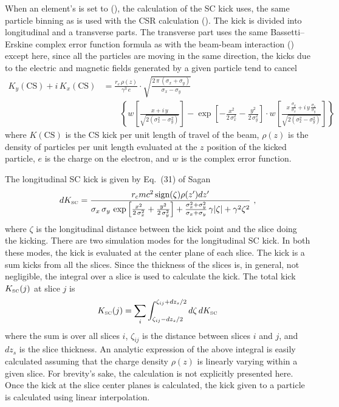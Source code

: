 When an element's  is set to  (), the
calculation of the SC kick uses, the same particle binning as is used with the  CSR
calculation (). The kick is divided into longitudinal and a transverse parts. The
transverse part uses the same Bassetti--Erskine complex error function formula\cite{b:talman} as
with the beam-beam interaction () except here, since all the particles are
moving in the same direction, the kicks due to the electric and magnetic fields generated by a given
particle tend to cancel
\begin{align}
  K_y(\text{CS}) + i \, K_x(\text{CS}) &=
  \frac{r_e \, \rho(z)}{\gamma^3 \, e} \cdot
  \sqrt{\frac{2 \, \pi \, (\sigma_x + \sigma_y)}{\sigma_x - \sigma_y}} \label{fsp1r} \\
  & \qquad \left\{ w \left[ \frac{x + i \, y}{\sqrt{2 (\sigma_x^2 - \sigma_y^2)}} \right] -
  \exp \left[ -\frac{x^2}{2 \, \sigma_x^2} - \frac{y^2}{2 \, \sigma_y^2} \right] \cdot
  w \left[ \frac{x \, \frac{\sigma_y}{\sigma_x} + i \, y \, \frac{\sigma_x}{\sigma_y}}
  {\sqrt{2 (\sigma_x^2 - \sigma_y^2)}} \right] \right\}
  \nonumber
\end{align}
where $K(\text{CS})$ is the CS kick per unit length of travel of the beam, $\rho(z)$ is
the density of particles per unit length evaluated at the $z$ position of the kicked
particle, $e$ is the charge on the electron,  and $w$ is the complex error function.

The longitudinal SC kick is given by Eq.~(31) of Sagan\cite{b:csr} 
\begin{equation}
 d K_{\mbox{\tiny SC}} =
  \frac{ r_c m c^2 \, \mbox{sign}(\zeta)\rho(z')dz'}
  {\sigma_x \, \sigma_y \, \exp
  \left[ \frac{x^2}{2 \, \sigma_x^2} + \frac{y^2}{2 \, \sigma_y^2} \right] +
  \frac{\sigma_x^2 + \sigma_y^2}{\sigma_x + \sigma_y} \, \gamma |\zeta| + \gamma^2\zeta^2}\ ,
  \label{kelsz}
\end{equation}
where $\zeta$ is the longitudinal distance between the kick point and the slice doing the kicking.
There are two simulation modes for the longitudinal SC kick. In both these modes, the kick is
evaluated at the center plane of each slice. The kick is a sum kicks from all the slices. Since the
thickness of the slices is, in general, not negligible, the integral over a slice is used to
calculate the kick. The total kick $K_{\mbox{\tiny SC}}(j)$ at slice $j$ is
\begin{equation}
  K_{\mbox{\tiny SC}} (j) = 
  \sum_i \int_{\zeta_{ij}-dz_s/2}^{\zeta_{ij}+dz_s/2} d\zeta \, dK_{\mbox{\tiny SC}}
\end{equation}
where the sum is over all slices $i$, $\zeta_{ij}$ is the distance between slices $i$ and $j$, and
$dz_s$ is the slice thickness. An analytic expression of the above integral is easily
calculated assuming that the charge density $\rho(z)$ is linearly varying within a given slice.  For
brevity's sake, the calculation is not explicitly presented here. Once the kick at the slice center
planes is calculated, the kick given to a particle is calculated using linear interpolation.

